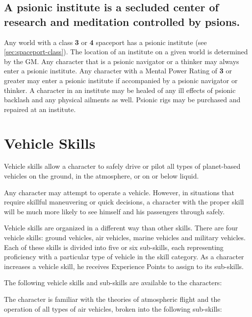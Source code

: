 \subsection[Psionic Institutes]{A psionic institute is a secluded
  center of research and meditation controlled by psions.}
\label{sec:psiinstitute}

Any world with a class \textbf{3} or \textbf{4} spaceport has a
psionic institute (see \ref{sec:spaceport-class}).  The location of an
institute on a given world is determined by the GM.  Any character that
is a psionic navigator or a thinker may always enter a psionic
institute.  Any character with a Mental Power Rating of \textbf{3} or
greater may enter a psionic institute if accompanied by a psionic
navigator or thinker.  A character in an institute may be healed of any
ill effects of psionic backlash and any physical ailments as well.
Psionic rigs may be purchased and repaired at an institute.


\section{Vehicle Skills}
\label{sec:vehicleskills}

Vehicle skills allow a character to safely drive or pilot all types of
planet-based vehicles on the ground, in the atmosphere, or on or
below liquid.

Any character may attempt to operate a vehicle.  However, in situations
that require skillful maneuvering or quick decisions, a character with
the proper skill will be much more likely to see himself and his
passengers through safely.

Vehicle skills are organized in a different way than other skills.
There are four vehicle skills: ground vehicles, air vehicles, marine
vehicles and military vehicles.  Each of these skills is divided into
five or six sub-skills, each representing proficiency with a
particular type of vehicle in the skill category.  As a character
increases a vehicle skill, he receives Experience Points to assign to
its sub-skills.

The following vehicle skills and sub-skills are available to the
characters:

\label{sec:skill-air-vehicles}

The character is familiar with the theories of atmospheric flight and
the operation of all types of air vehicles, broken into the following
sub-skills:

